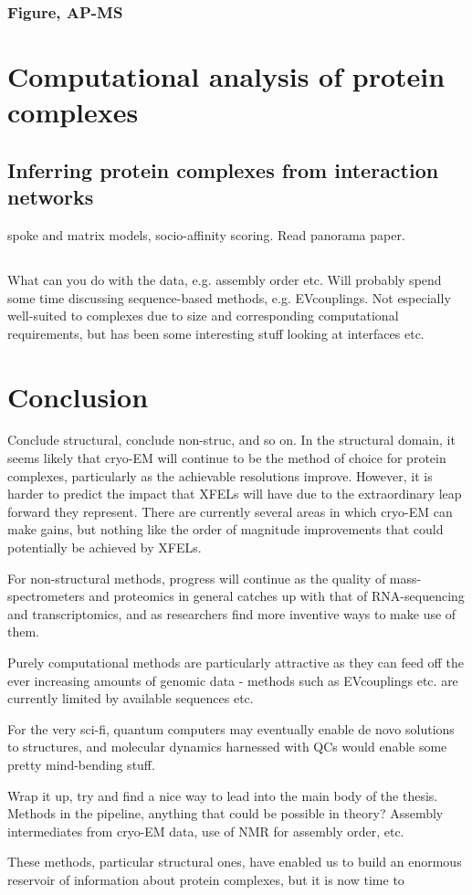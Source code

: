 \documentclass[a4paper,11pt,twoside,openright]{scrbook}
\let\cite\supercite
\begin{document}

\subsubsection{Figure, AP-MS}

\section{Computational analysis of protein complexes}
\subsection{Inferring protein complexes from interaction networks}
spoke and matrix models, socio-affinity scoring. Read panorama paper. \cite{Wan2015}
\subsection{}
What can you do with the data, e.g. assembly order etc. Will probably spend some time discussing sequence-based methods, e.g. EVcouplings. Not especially well-suited to complexes due to size and corresponding computational requirements, but has been some interesting stuff looking at interfaces etc.

\section{Conclusion}
Conclude structural, conclude non-struc, and so on. In the structural domain, it seems likely that cryo-EM will continue to be the method of choice for protein complexes, particularly as the achievable resolutions improve. However, it is harder to predict the impact that XFELs will have due to the extraordinary leap forward they represent. There are currently several areas in which cryo-EM can make gains, but nothing like the order of magnitude improvements that could potentially be achieved by XFELs.

For non-structural methods, progress will continue as the quality of mass-spectrometers and proteomics in general catches up with that of RNA-sequencing and transcriptomics, and as researchers find more inventive ways to make use of them.

Purely computational methods are particularly attractive as they can feed off the ever increasing amounts of genomic data - methods such as EVcouplings etc. are currently limited by available sequences etc.

For the very sci-fi, quantum computers may eventually enable de novo solutions to structures, and molecular dynamics harnessed with QCs would enable some pretty mind-bending stuff.

Wrap it up, try and find a nice way to lead into the main body of the thesis. Methods in the pipeline, anything that could be possible in theory? Assembly intermediates from cryo-EM data, use of NMR for assembly order, etc.

These methods, particular structural ones, have enabled us to build an enormous reservoir of information about protein complexes, but it is now time to

\printbibliography
\end{document}
